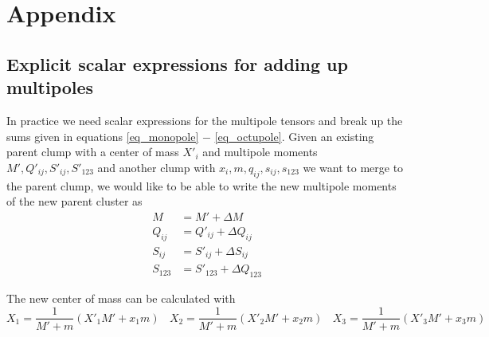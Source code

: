 \section{Appendix}

\subsection{Explicit scalar expressions for adding up multipoles}

In practice we need scalar expressions for the multipole tensors and break up the sums given in equations \ref{eq_monopole} $-$ \ref{eq_octupole}. Given an existing parent clump with a center of mass $X'_{i}$ and multipole moments $M', Q'_{i j}, S'_{i j}, S'_{123}$ and another clump with $x_i, m, q_{i j}, s_{i j}, s_{123}$ we want to merge to the parent clump, we would like to be able to write the new multipole moments of the new parent cluster as
\begin{align}
M &= M' + \Delta M \nonumber \\
Q_{ij} &= Q'_{ij} + \Delta Q_{ij} \nonumber \\
S_{ij} &= S'_{ij} + \Delta S_{ij} \nonumber \\
S_{123} &= S'_{123} + \Delta Q_{123} \nonumber
\end{align}

The new center of mass can be calculated with
\begin{equation}
X_{1} = \frac{1}{M'+m} (X'_{1} M' + x_1 m) ~~~~ X_{2} = \frac{1}{M'+m} (X'_{2} M' + x_2 m) ~~~~ X_{3} = \frac{1}{M'+m} (X'_{3} M' + x_3 m) \nonumber
\end{equation}


